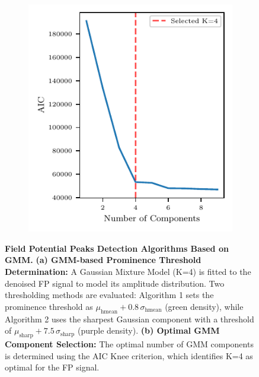 \documentclass{report}
\begin{document}
\begin{figure}[h]
\begin{subfigure}[b]{0.45\textwidth}
                   \label{fig:fp-gmm-prominenence-algos}
                \end{subfigure}
                ~
                \begin{subfigure}[b]{0.45\textwidth}
                   \includegraphics[width=\textwidth,height=0.38\textheight, keepaspectratio]{plots/chapter_3/mea_denoised_aic.pdf}
                    \caption[GMM optimal AIC with Knee]{}
                    \label{fig:fp-aic-optimal-gmm}
                \end{subfigure}
                \caption[Field Potential Peaks Detection Algorithms Based on GMM]{\textbf{Field Potential Peaks Detection Algorithms Based on GMM.} \textbf{(a) GMM-based Prominence Threshold Determination:} A Gaussian Mixture Model (K=4) is fitted to the denoised FP signal to model its amplitude distribution. Two thresholding methods are evaluated: Algorithm 1 sets the prominence threshold as $\mu_{\text{hmean}}+0.8\,\sigma_{\text{hmean}}$ (green density), while Algorithm 2 uses the sharpest Gaussian component with a threshold of $\mu_{\text{sharp}}+7.5\,\sigma_{\text{sharp}}$ (purple density). \textbf{(b) Optimal GMM Component Selection:} The optimal number of GMM components is determined using the AIC Knee criterion, which identifies K=4 as optimal for the FP signal.}

             \end{figure}
\end{document}
